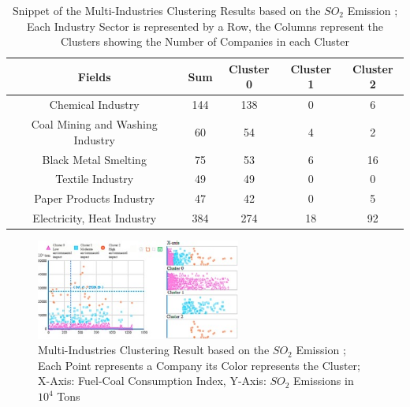 \begin{table}[h]
    \centering
    \begin{tabular}{c|c|c|c|c}
        \textbf{Fields} & \textbf{Sum} & \textbf{Cluster 0} & \textbf{Cluster 1} & \textbf{Cluster 2} \\
        \hline
        Chemical Industry & 144 & 138 & 0 & 6 \\
        Coal Mining and Washing Industry & 60 & 54 & 4 & 2 \\
        Black Metal Smelting & 75 & 53 & 6 & 16 \\
        Textile Industry & 49 & 49 & 0 & 0 \\
        Paper Products Industry & 47 & 42 & 0 & 5 \\
        Electricity, Heat Industry & 384 & 274 & 18 & 92 \\
    \end{tabular}
    \caption{Snippet of the Multi-Industries Clustering Results based on the $SO_2$ Emission \cite{LIU-BDE};
    Each Industry Sector is represented by a Row, the Columns represent the Clusters showing the Number of Companies in each Cluster}
    \label{tab:multi_industries_clustering_results_based_on_the_so2_emission}
\end{table}

\begin{figure}
    \centering
    \includegraphics[width=0.6\textwidth]{figures/liu_assessmentOfIndustries/liu_environmentalPerformance.jpg}
    \caption{Multi-Industries Clustering Result based on the $SO_2$ Emission \cite{LIU-BDE};
    Each Point represents a Company its Color represents the Cluster;
    X-Axis: Fuel-Coal Consumption Index, Y-Axis: $SO_2$ Emissions in $10^4$ Tons}
    \label{fig:multi_industries_clustering_result_environemental_performance}
\end{figure}

